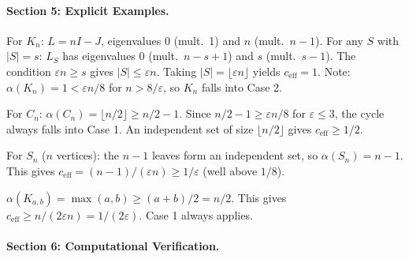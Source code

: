 
\paragraph{Section 5: Explicit Examples.}

\begin{proposition}\label{prop:p6-Kn}
For $K_n$: $L = nI - J$, eigenvalues $0$ (mult.~1) and $n$ (mult.~$n-1$).
For any $S$ with $|S| = s$: $L_S$ has eigenvalues $0$ (mult.~$n-s+1$) and $s$
(mult.~$s-1$).  The condition $\varepsilon n \geq s$ gives
$|S| \leq \varepsilon n$.  Taking $|S| = \lfloor\varepsilon n\rfloor$ yields
$c_{\mathrm{eff}} = 1$.  Note: $\alpha(K_n) = 1 < \varepsilon n / 8$ for
$n > 8/\varepsilon$, so $K_n$ falls into Case 2.
\end{proposition}

\begin{proposition}[Cycle $C_n$]\label{prop:p6-Cn}
For $C_n$: $\alpha(C_n) = \lfloor n/2 \rfloor \geq n/2 - 1$.  Since
$n/2 - 1 \geq \varepsilon n / 8$ for $\varepsilon \leq 3$, the cycle always
falls into Case 1.  An independent set of size $\lfloor n/2 \rfloor$ gives
$c_{\mathrm{eff}} \geq 1/2$.
\end{proposition}

\begin{proposition}[Star $S_n$]\label{prop:p6-Star}
For $S_n$ ($n$ vertices): the $n-1$ leaves form an independent set, so
$\alpha(S_n) = n-1$.  This gives $c_{\mathrm{eff}} = (n-1)/(\varepsilon n)
\geq 1/\varepsilon$ (well above $1/8$).
\end{proposition}

\begin{proposition}\label{prop:p6-Kab}
$\alpha(K_{a,b}) = \max(a,b) \geq (a+b)/2 = n/2$.  This gives
$c_{\mathrm{eff}} \geq n/(2\varepsilon n) = 1/(2\varepsilon)$.  Case 1 always
applies.
\end{proposition}


\paragraph{Section 6: Computational Verification.}

